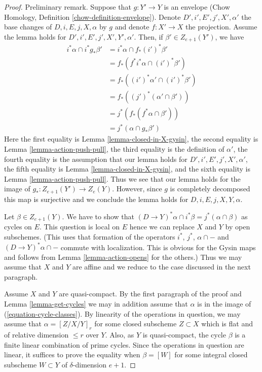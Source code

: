 \begin{proof}
Preliminary remark.
Suppose that $g : Y' \to Y$ is an envelope (Chow Homology, Definition
\ref{chow-definition-envelope}).
Denote $D', i', E', j', X', \alpha'$ the base changes of
$D, i, E, j, X, \alpha$ by $g$ and denote $f : X' \to X$ the projection.
Assume the lemma holds for $D', i', E', j', X', Y', \alpha'$.
Then, if $\beta' \in Z_{e + 1}(Y')$, we have
\begin{align*}
i^*\alpha \cap i^*g_*\beta'
& =
i^*\alpha \cap f_*(i')^*\beta' \\
& =
f_*(f^*i^*\alpha \cap (i')^*\beta') \\
& =
f_*((i')^*\alpha' \cap (i')^*\beta') \\
& =
f_*((j')^*(\alpha' \cap \beta')) \\
& =
j^*(f_*(f^*\alpha \cap \beta')) \\
& =
j^*(\alpha \cap g_*\beta')
\end{align*}
Here the
first equality is Lemma \ref{lemma-closed-in-X-gysin},
the second equality is Lemma \ref{lemma-action-push-pull},
the third equality is the definition of $\alpha'$,
the fourth equality is the assumption that our lemma holds for
$D', i', E', j', X', \alpha'$,
the fifth equality is Lemma \ref{lemma-closed-in-X-gysin}, and
the sixth equality is Lemma \ref{lemma-action-push-pull}.
Thus we see that our lemma holds for the image of
$g_* : Z_{e + 1}(Y') \to Z_e(Y)$. However, since $g$ is completely
decomposed this map is surjective and we conclude the lemma holds
for $D, i, E, j, X, Y, \alpha$.

\medskip\noindent
Let $\beta \in Z_{e + 1}(Y)$. We have to show that
$(D \to Y)^*\alpha \cap i^*\beta = j^*(\alpha \cap \beta)$
as cycles on $E$. This question is local on $E$ hence we
can replace $X$ and $Y$ by open subschemes. (This uses that formation
of the operators $i^*$, $j^*$, $\alpha \cap - $ and
$(D \to Y)^*\alpha \cap -$ commute with localization. This is
obvious for the Gysin maps and follows from
Lemma \ref{lemma-action-opens} for the others.)
Thus we may assume that $X$ and $Y$ are affine
and we reduce to the case discussed in the next paragraph.

\medskip\noindent
Assume $X$ and $Y$ are quasi-compact. By the first paragraph of the proof
and Lemma \ref{lemma-get-cycles} we may in addition assume that $\alpha$
is in the image of (\ref{equation-cycle-classes}). By linearity
of the operations in question, we may assume that $\alpha = [Z/X/Y]_r$
for some closed subscheme $Z \subset X$ which is flat and of relative
dimension $\leq r$ over $Y$. Also, as $Y$ is quasi-compact, the cycle
$\beta$ is a finite linear combination of prime cycles. Since the operations
in question are linear, it suffices
to prove the equality when $\beta = [W]$ for some integral closed subscheme
$W \subset Y$ of $\delta$-dimension $e + 1$.


\end{proof}
